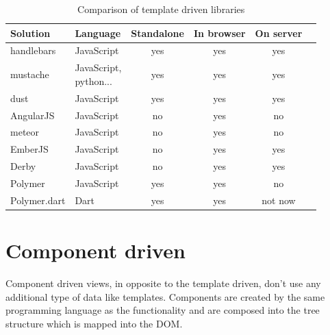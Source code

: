 \documentclass[oneside, 12pt]{book}
\begin{document}
  \begin{table}
    \begin{tabular}{|l|l|c|c|c|c|}
      \hline
      \textbf{Solution}& \textbf{Language}   & \textbf{Standalone} & \textbf{In browser} & \textbf{On server} \\
      \hline
      handlebars       & JavaScript          &         yes         &        yes          &        yes         \\
      \hline
      {{mustache}}     & \shortstack{JavaScript,  
                            \\    python...} &        yes         &        yes          &        yes          \\
      \hline
      dust             & JavaScript          &         yes         &        yes          &        yes         \\
      \hline
      AngularJS        & JavaScript          &         no          &        yes          &        no          \\
      \hline
      meteor           & JavaScript          &         no          &        yes          &        no          \\
      \hline
      EmberJS          & JavaScript          &         no          &        yes          &        yes         \\
      \hline
      Derby            & JavaScript          &         no          &        yes          &        yes         \\
      \hline
      Polymer          & JavaScript          &         yes         &        yes          &        no          \\
      \hline
      Polymer.dart     & Dart                &         yes         &        yes          &      not now       \\
      \hline
    \end{tabular}
    \caption{Comparison of template driven libraries}
    \label{table:template-driven-libraries}
  \end{table}

\section{Component driven}\label{sec:existing-component}

  Component driven views, in opposite to the template driven, don't use any additional type of data like templates. 
  Components are created by the same programming language as the functionality and 
  are composed into the tree structure which is mapped into the DOM. 
\end{document}

